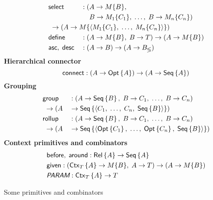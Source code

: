 \begin{table}
\begin{framed}
\begin{alignat*}{2}
        & \Select & : (& A \to M\{B\}, \\
        & && B \to M_1\{C_1\},\; \ldots,\; B \to M_n\{C_n\}) \\
        & \;\to (A \to M\{\Tuple{M_1\{C_1\},\; \ldots,\; M_n\{C_n\}}\})\hidewidth && \\
        & \Define & : (& A \to M\{B\},\; B \to T) \to (A \to M\{B\}) \\
        & \Asc,\; \Desc\; & : (& A \to B) \to (A \to B_\lessgtr)
    \end{alignat*}
    \textbf{Hierarchical connector}
    \begin{equation*}
        \textup{\textsf{connect}} : (A \to \textup{\textsf{Opt}}\left\{A\right\}) \to (A \to \textup{\textsf{Seq}}\left\{A\right\})
    \end{equation*}
    \textbf{Grouping}
    \begin{alignat*}{2}
        & \textup{\textsf{group}} && : ( A \to \textup{\textsf{Seq}}\left\{B\right\},\; B \to C_1,\; \ldots,\; B \to C_n) \\
        & \;\to (A && \to \textup{\textsf{Seq}}\left\{\langle C_1,\; \ldots,\; C_n,\; \textup{\textsf{Seq}}\left\{B\right\} \rangle\right\}) \\
        & \textup{\textsf{rollup}} && : ( A \to \textup{\textsf{Seq}}\left\{B\right\},\; B \to C_1,\; \ldots,\; B \to C_n) \\
        & \;\to (A && \to \textup{\textsf{Seq}}\left\{\langle \textup{\textsf{Opt}}\left\{C_1\right\},\; \ldots,\; \textup{\textsf{Opt}}\left\{C_n\right\},\; \textup{\textsf{Seq}}\left\{B\right\} \rangle\right\})
    \end{alignat*}
    \textbf{Context primitives and combinators}
    \begin{alignat*}{2}
        & \textup{\textsf{before}},\; \textup{\textsf{around}} : \textup{\textsf{Rel}}\left\{A\right\} \to \textup{\textsf{Seq}}\left\{A\right\} \\
        & \textup{\textsf{given}} : (\textup{\textsf{Ctx}}_{T}\left\{A\right\} \to M\{B\},\; A \to T) \to (A \to M\{B\}) \\
        & \textit{\textsf{PARAM}} : \textup{\textsf{Ctx}}_{T}\left\{A\right\} \to T
    \end{alignat*}
    \end{framed}
    \caption{Some primitives and combinators}
    \label{tab:common-combinators}
\end{table}

